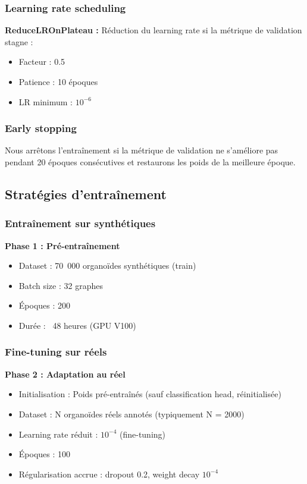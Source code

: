 \subsubsection{Learning rate scheduling}

\textbf{ReduceLROnPlateau :}
Réduction du learning rate si la métrique de validation stagne :
\begin{itemize}
    \item Facteur : 0.5
    \item Patience : 10 époques
    \item LR minimum : $10^{-6}$
\end{itemize}

\subsubsection{Early stopping}

Nous arrêtons l'entraînement si la métrique de validation ne s'améliore pas pendant 20 époques consécutives et restaurons les poids de la meilleure époque.

\subsection{Stratégies d'entraînement}

\subsubsection{Entraînement sur synthétiques}

\textbf{Phase 1 : Pré-entraînement}
\begin{itemize}
    \item Dataset : 70~000 organoïdes synthétiques (train)
    \item Batch size : 32 graphes
    \item Époques : 200
    \item Durée : ~48 heures (GPU V100)
\end{itemize}

\subsubsection{Fine-tuning sur réels}

\textbf{Phase 2 : Adaptation au réel}
\begin{itemize}
    \item Initialisation : Poids pré-entraînés (sauf classification head, réinitialisée)
    \item Dataset : N organoïdes réels annotés (typiquement N = 2000)
    \item Learning rate réduit : $10^{-4}$ (fine-tuning)
    \item Époques : 100
    \item Régularisation accrue : dropout 0.2, weight decay $10^{-4}$
\end{itemize}

